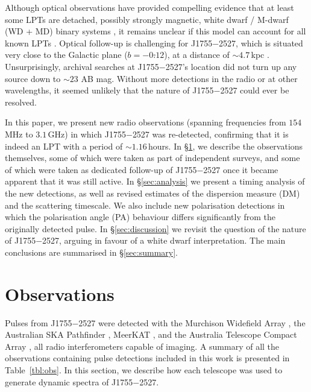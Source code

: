 \documentclass[fleqn,usenatbib]{mnras}
\newcommand{\revision}[2]{{\color{red}#2}}
\newcommand{\src}{J1755$-$2527}
\newcommand{\Tab}{Table}
\begin{document}
Although optical observations have provided compelling evidence that at least some LPTs are detached, possibly strongly magnetic, \revision{white dwarf (WD) binaries}{white dwarf / M-dwarf (WD + MD) binary systems} \citep{deRuiter2025,2024ApJ...976L..21H,2025A&A...695L...8R}, it remains unclear if this model can account for all known LPTs \citep[e.g.][]{2022ApJ...940...72R,Lee2025}.
Optical follow-up is challenging for \src{}, which is situated very close to the Galactic plane ($b = -0\overset{\circ}{.}12$), at a distance of ${\sim}4.7\,$kpc .
Unsurprisingly, archival searches at \src{}'s location did not turn up any source down to ${\sim}23$ AB mag.
Without more detections in the radio or at other wavelengths, it seemed unlikely that the nature of \src{} could ever be resolved.

In this paper, we present new radio observations (spanning frequencies from $154\,$MHz to $3.1\,$GHz) in which \src{} was re-detected, confirming that it is indeed an LPT with a period of ${\sim}1.16\,$hours.
In \S\ref{sec:observations}, we describe the observations themselves, some of which were taken as part of independent surveys, and some of which were taken as dedicated follow-up of \src{} once it became apparent that it was still active.
In \S\ref{sec:analysis} we present a timing analysis of the new detections, as well as revised estimates of the dispersion measure (DM) and the scattering timescale.
We also include new polarisation detections in which the polarisation angle (PA) behaviour differs significantly from the originally detected pulse.
In \S\ref{sec:discussion} we revisit the question of the nature of \src{}, arguing in favour of a white dwarf interpretation.
The main conclusions are summarised in \S\ref{sec:summary}.

\section{Observations} \label{sec:observations}

Pulses from \src{} were detected with the Murchison Widefield Array \citep[MWA;][]{Tingay2013}, the Australian SKA Pathfinder \citep[ASKAP;][]{2021PASA...38....9H}, MeerKAT \citep{2016mks..confE...1J}, and the Australia Telescope Compact Array \citep[ATCA;][]{cabb}, all radio interferometers capable of imaging.
A summary of all the observations containing pulse detections included in this work is \revision{summarised}{presented} in \Tab~\ref{tbl:obs}.
In this section, we describe how each telescope was used to generate dynamic spectra of \src{}.
\end{document}
